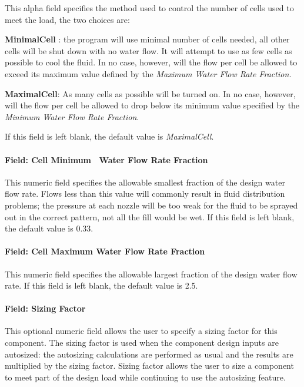 This alpha field specifies the method used to control the number of cells used to meet the load, the two choices are:

\textbf{MinimalCell} : the program will use minimal number of cells needed, all other cells will be shut down with no water flow. It will attempt to use as few cells as possible to cool the fluid. In no case, however, will the flow per cell be allowed to exceed its maximum value defined by the \emph{Maximum Water Flow Rate Fraction.}

\textbf{MaximalCell}: As many cells as possible will be turned on. In no case, however, will the flow per cell be allowed to drop below its minimum value specified by the \emph{Minimum Water Flow Rate Fraction}.

If this field is left blank, the default value is \textit{MaximalCell}.

\paragraph{Field: Cell Minimum~ Water Flow Rate Fraction}\label{field-cell-minimum-water-flow-rate-fraction-2}

This numeric field specifies the allowable smallest fraction of the design water flow rate. Flows less than this value will commonly result in fluid distribution problems; the pressure at each nozzle will be too weak for the fluid to be sprayed out in the correct pattern, not all the fill would be wet. If this field is left blank, the default value is 0.33.

\paragraph{Field: Cell Maximum Water Flow Rate Fraction}\label{field-cell-maximum-water-flow-rate-fraction-2}

This numeric field specifies the allowable largest fraction of the design water flow rate. If this field is left blank, the default value is 2.5.

\paragraph{Field: Sizing Factor}\label{field-sizing-factor-1}

This optional numeric field allows the user to specify a sizing factor for this component. The sizing factor is used when the component design inputs are autosized: the autosizing calculations are performed as usual and the results are multiplied by the sizing factor. Sizing factor allows the user to size a component to meet part of the design load while continuing to use the autosizing feature.

